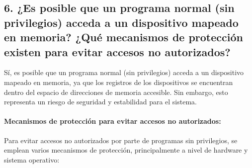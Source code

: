 \documentclass[12pt]{article}
\begin{document}
\subsection*{6. ¿Es posible que un programa normal (sin privilegios) acceda a un dispositivo mapeado en memoria? ¿Qué mecanismos de protección existen para evitar accesos no autorizados?}

Sí, es posible que un programa normal (sin privilegios) acceda a un dispositivo mapeado en memoria, ya que los registros de los dispositivos se encuentran dentro del espacio de direcciones de memoria accesible. Sin embargo, esto representa un riesgo de seguridad y estabilidad para el sistema.

\paragraph{Mecanismos de protección para evitar accesos no autorizados:}
Para evitar accesos no autorizados por parte de programas sin privilegios, se emplean varios mecanismos de protección, principalmente a nivel de hardware y sistema operativo:
\end{document}
